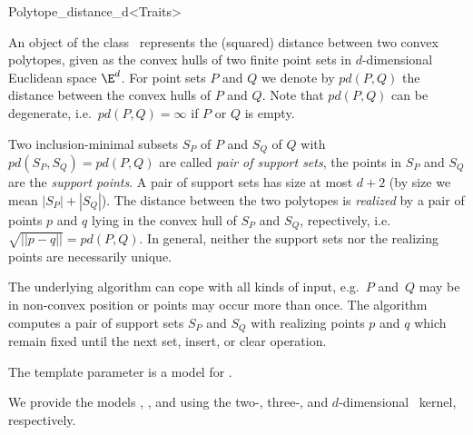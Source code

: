 
\begin{ccRefClass}{Polytope_distance_d<Traits>}


\ccSaveThreeColumns
\cgalPolytopeDistanceLayout

\newcommand{\PDempty}{%
  $pd(\emptyset, \emptyset)$}

\ccDefinition

An object of the class \ccRefName\ represents the (squared) distance
between two convex polytopes, given as the convex hulls of two finite point
sets in $d$-dimensional Euclidean space $\E^d$. For point sets $P$ and $Q$
we denote by $pd(P,Q)$ the distance between the convex hulls of $P$ and
$Q$. Note that $pd(P,Q)$ can be
degenerate,
i.e.~$pd(P,Q)=\infty$ if $P$ or $Q$ is empty.

Two inclusion-minimal subsets $S_P$ of $P$ and $S_Q$ of $Q$ with
$pd(S_P,S_Q)=pd(P,Q)$ are called \emph{pair of support
  sets}, the
points in $S_P$ and $S_Q$ are the \emph{support points}. A pair of support
sets has size at most $d+2$ (by size we mean $|S_P|+|S_Q|$). The distance
between the two polytopes is \emph{realized} by a pair of points $p$ and
$q$ lying in the convex hull of $S_P$ and $S_Q$, repectively,
i.e.~$\sqrt{||p-q||}=pd(P,Q)$. In general, neither the support sets nor the
realizing points are necessarily unique.

The underlying algorithm can cope with all kinds of input, e.g.~$P$ and~$Q$
may be in non-convex position or points may occur more than once. The
algorithm computes a pair of support sets $S_P$ and $S_Q$ with realizing
points $p$ and $q$ which remain fixed until the next set, insert, or clear
operation.


\ccRequirements
\ccIndexRequirements

The template parameter  is a model for .

We provide the models ,
, and  using the
two-, three-, and $d$-dimensional \cgal~kernel, respectively.


\end{ccRefClass}
